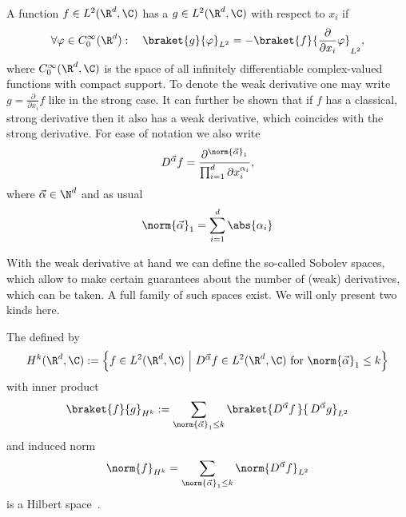 \begin{defn}
	A function $f \in L^2(\R^d, \C)$ has a 
	$g \in L^2(\R^d, \C)$ with respect to $x_i$ if
	\[ \forall \varphi \in C^\infty_0(\R^d): \quad \braket{g}{\varphi}_{L^2} = - \braket{f}{\frac{\partial}{\partial x_i}\varphi}_{L^2}, \]
	where $C^\infty_0(\R^d, \C)$ is the space of all
	infinitely differentiable complex-valued functions with compact support.
	To denote the weak derivative
	one may write $g = \frac{\partial}{\partial x_i} f$ like in the strong case.
	It can further be shown that if $f$ has a classical, strong derivative
	then it also has a weak derivative, which coincides with the strong derivative.
	For ease of notation we also write
	\[ D^{\vec{\alpha}} f = \frac{\partial^{\norm{\vec{\alpha}}_1}}{ \prod_{i=1}^d \partial x_i^{\alpha_i} }, \]
	where $\vec{\alpha} \in \N^d$ and as usual
	\[ \norm{\vec{\alpha}}_1 = \sum_{i=1}^d \abs{\alpha_i} \]
\end{defn}

\noindent
With the weak derivative at hand we can define the so-called Sobolev spaces,
which allow to make certain guarantees about the number of (weak)
derivatives, which can be taken.
A full family of such spaces exist. We will only present two kinds here.

\begin{defn}
	The  defined by
	\begin{equation}
		H^k(\R^d, \C) := \left\{ f \in L^2(\R^d, \C) ~\middle|~ D^{\vec{\alpha}} f \in L^2(\R^d, \C) \text{ for $\norm{\vec{\alpha}}_1 \le k$} \right\}
		\label{eqn:defSobolev}
	\end{equation}
	with inner product
	\begin{equation}
		\braket{f}{g}_{H^k} := \sum_{\norm{\vec{\alpha}}_1 \le k} \braket{D^{\vec{\alpha}} f\,}{\,D^{\vec{\alpha}} g}_{L^2}
		\label{eqn:defSobolevInnProd}
	\end{equation}
	and induced norm
	\begin{equation}
		\norm{f}_{H^k} = \sum_{\norm{\vec{\alpha}}_1 \le k} \norm{D^{\vec{\alpha}} f}_{L^2}
		\label{eqn:defSobolevNorm}
	\end{equation}
	is a Hilbert space~\cite{Adams2003}.
\end{defn}


